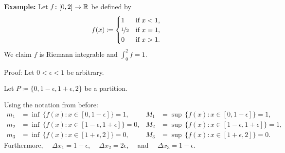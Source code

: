 \documentclass[10pt,aspectratio=169]{beamer}
\begin{document}
\begin{frame}

\textbf{Example:}
Let $f \colon [0,2] \to {\mathbb{R}}$ be defined by
\begin{equation*}
f(x) \coloneqq
\begin{cases}
1               & \text{if } x < 1,\\
\nicefrac{1}{2} & \text{if } x = 1,\\
0               & \text{if } x > 1.
\end{cases}
\end{equation*}
\pause
We claim $f$ is Riemann integrable and $\displaystyle \int_0^2 f = 1$.

\pause
\medskip

Proof: Let $0 < \epsilon < 1$ be arbitrary.

\pause
Let $P \coloneqq \{0, 1-\epsilon, 1+\epsilon, 2\}$ be a partition.

\pause
Using the notation from before:
\begin{align*}
m_1 &= \inf \, \bigl\{ f(x) : x \in [0,1-\epsilon] \bigr\} = 1 , & 
M_1 &= \sup \, \bigl\{ f(x) : x \in [0,1-\epsilon] \bigr\} = 1 , \\
m_2 &= \inf \, \bigl\{ f(x) : x \in [1-\epsilon,1+\epsilon] \bigr\} = 0 , & 
M_2 &= \sup \, \bigl\{ f(x) : x \in [1-\epsilon,1+\epsilon] \bigr\} = 1 , \\
m_3 &= \inf \, \bigl\{ f(x) : x \in [1+\epsilon,2] \bigr\} = 0 , & 
M_3 &= \sup \, \bigl\{ f(x) : x \in [1+\epsilon,2] \bigr\} = 0 .
\end{align*}
\pause
Furthermore, ~~$\Delta x_1 = 1-\epsilon$,
~~$\Delta x_2 = 2\epsilon$,~~ and ~~$\Delta x_3 = 1-\epsilon$.

\end{frame}
\end{document}
